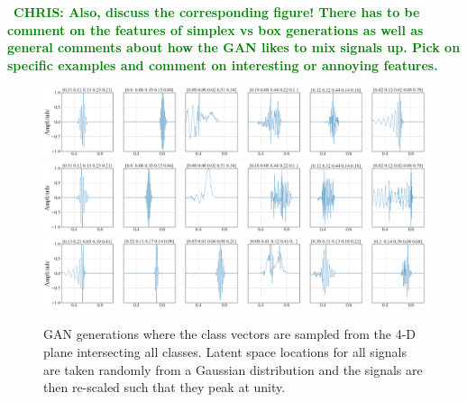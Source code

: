\documentclass[12pt]{iopart}
\newcommand{\chris}[1]{\textbf{\textcolor{green}{CHRIS: #1}}}
\begin{document}
~\chris{Also, discuss the corresponding figure! There has to be comment on the
features of simplex vs box generations as well as general comments about how
the GAN likes to mix signals up. Pick on specific examples and comment on
interesting or annoying features.}

\begin{figure}
    \centering
    \includegraphics[width=\textwidth]{figures/generations/simplex_sample1.png}
    \includegraphics[width=\textwidth]{figures/generations/simplex_sample2.png}
    \includegraphics[width=\textwidth]{figures/generations/simplex_sample3.png}
    \caption{GAN generations where the class vectors are sampled from the 4-D
plane intersecting all classes. Latent space locations for all signals are taken randomly from a Gaussian distribution and the signals are then re-scaled such that they peak at unity.}
    \label{fig:simplexd_samples}
\end{figure}
\end{document}
